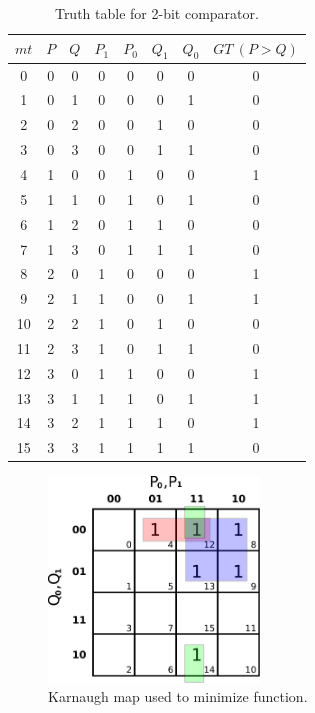 \documentclass{article}
\begin{document}
\begin{table}[hbtp]
  \centering
  \begin{tabular}{c|cc|cccc|c}
    $mt$ & $P$ & $Q$ & $P_1$ & $P_0$ & $Q_1$ & $Q_0$ & $GT~(P > Q)$ \\
    \hline
   0 & 0 & 0 & 0 & 0 & 0 & 0 & 0 \\
   1 & 0 & 1 & 0 & 0 & 0 & 1 & 0 \\
   2 & 0 & 2 & 0 & 0 & 1 & 0 & 0 \\
   3 & 0 & 3 & 0 & 0 & 1 & 1 & 0 \\
   4 & 1 & 0 & 0 & 1 & 0 & 0 & 1 \\
   5 & 1 & 1 & 0 & 1 & 0 & 1 & 0 \\
   6 & 1 & 2 & 0 & 1 & 1 & 0 & 0 \\
   7 & 1 & 3 & 0 & 1 & 1 & 1 & 0 \\
   8 & 2 & 0 & 1 & 0 & 0 & 0 & 1 \\
   9 & 2 & 1 & 1 & 0 & 0 & 1 & 1 \\
  10 & 2 & 2 & 1 & 0 & 1 & 0 & 0 \\
  11 & 2 & 3 & 1 & 0 & 1 & 1 & 0 \\
  12 & 3 & 0 & 1 & 1 & 0 & 0 & 1 \\
  13 & 3 & 1 & 1 & 1 & 0 & 1 & 1 \\
  14 & 3 & 2 & 1 & 1 & 1 & 0 & 1 \\
  15 & 3 & 3 & 1 & 1 & 1 & 1 & 0 \\
  \end{tabular}
  \caption{\label{tab:truth}Truth table for 2-bit comparator.}
\end{table}

\begin{figure}[hbtp]
  \centering
  \includegraphics[width=0.5\textwidth]{k_map}
  \caption{\label{fig:k_map} Karnaugh map used to minimize function.}
\end{figure}
\end{document}
